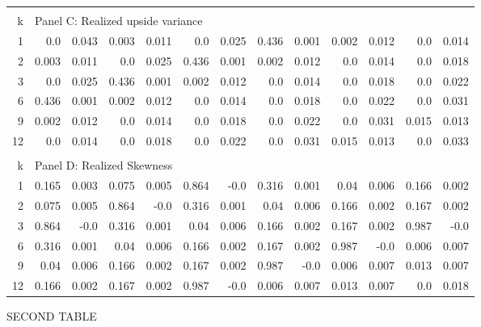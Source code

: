 \documentclass{article}
\begin{document}
\begin{center}
\begin{tabular}{@{\extracolsep{6pt}}rrrrrrrrrrrrr@{}}
\hline\\[0.000000001pt]

k & \multicolumn{12}{l}{Panel C: Realized upside variance} \\[7pt]

\hline

1 & 0.0 & 0.043 & 0.003 & 0.011 & 0.0 & 0.025 & 0.436 & 0.001 & 0.002 & 0.012 & 0.0 & 0.014 \\[6pt]
2 & 0.003 & 0.011 & 0.0 & 0.025 & 0.436 & 0.001 & 0.002 & 0.012 & 0.0 & 0.014 & 0.0 & 0.018 \\[6pt]
3 & 0.0 & 0.025 & 0.436 & 0.001 & 0.002 & 0.012 & 0.0 & 0.014 & 0.0 & 0.018 & 0.0 & 0.022 \\[6pt]
6 & 0.436 & 0.001 & 0.002 & 0.012 & 0.0 & 0.014 & 0.0 & 0.018 & 0.0 & 0.022 & 0.0 & 0.031 \\[6pt]
9 & 0.002 & 0.012 & 0.0 & 0.014 & 0.0 & 0.018 & 0.0 & 0.022 & 0.0 & 0.031 & 0.015 & 0.013 \\[6pt]
12 & 0.0 & 0.014 & 0.0 & 0.018 & 0.0 & 0.022 & 0.0 & 0.031 & 0.015 & 0.013 & 0.0 & 0.033 \\[6pt]


\hline\\[0.000000001pt]

k & \multicolumn{12}{l}{Panel D: Realized Skewness} \\[7pt]

\hline

1 & 0.165 & 0.003 & 0.075 & 0.005 & 0.864 & -0.0 & 0.316 & 0.001 & 0.04 & 0.006 & 0.166 & 0.002 \\[6pt]
2 & 0.075 & 0.005 & 0.864 & -0.0 & 0.316 & 0.001 & 0.04 & 0.006 & 0.166 & 0.002 & 0.167 & 0.002 \\[6pt]
3 & 0.864 & -0.0 & 0.316 & 0.001 & 0.04 & 0.006 & 0.166 & 0.002 & 0.167 & 0.002 & 0.987 & -0.0 \\[6pt]
6 & 0.316 & 0.001 & 0.04 & 0.006 & 0.166 & 0.002 & 0.167 & 0.002 & 0.987 & -0.0 & 0.006 & 0.007 \\[6pt]
9 & 0.04 & 0.006 & 0.166 & 0.002 & 0.167 & 0.002 & 0.987 & -0.0 & 0.006 & 0.007 & 0.013 & 0.007 \\[6pt]
12 & 0.166 & 0.002 & 0.167 & 0.002 & 0.987 & -0.0 & 0.006 & 0.007 & 0.013 & 0.007 & 0.0 & 0.018 \\[6pt]


\hline

\end{tabular}
\end{center}
\restoregeometry

SECOND TABLE
\end{document}
